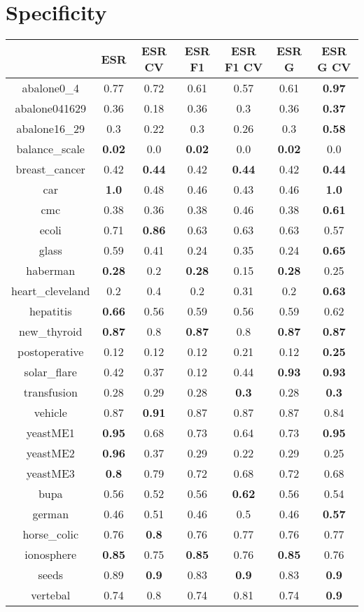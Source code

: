\documentclass{article}%
\begin{document}
%
\section*{Specificity}%
\begin{tabular}{c|cccccc}%
\hline%
&ESR&ESR CV&ESR F1&ESR F1 CV&ESR G&ESR G CV\\%
\hline%
abalone0\_4&0.77&0.72&0.61&0.57&0.61&\textbf{0.97}\\%
\hline%
abalone041629&0.36&0.18&0.36&0.3&0.36&\textbf{0.37}\\%
\hline%
abalone16\_29&0.3&0.22&0.3&0.26&0.3&\textbf{0.58}\\%
\hline%
balance\_scale&\textbf{0.02}&0.0&\textbf{0.02}&0.0&\textbf{0.02}&0.0\\%
\hline%
breast\_cancer&0.42&\textbf{0.44}&0.42&\textbf{0.44}&0.42&\textbf{0.44}\\%
\hline%
car&\textbf{1.0}&0.48&0.46&0.43&0.46&\textbf{1.0}\\%
\hline%
cmc&0.38&0.36&0.38&0.46&0.38&\textbf{0.61}\\%
\hline%
ecoli&0.71&\textbf{0.86}&0.63&0.63&0.63&0.57\\%
\hline%
glass&0.59&0.41&0.24&0.35&0.24&\textbf{0.65}\\%
\hline%
haberman&\textbf{0.28}&0.2&\textbf{0.28}&0.15&\textbf{0.28}&0.25\\%
\hline%
heart\_cleveland&0.2&0.4&0.2&0.31&0.2&\textbf{0.63}\\%
\hline%
hepatitis&\textbf{0.66}&0.56&0.59&0.56&0.59&0.62\\%
\hline%
new\_thyroid&\textbf{0.87}&0.8&\textbf{0.87}&0.8&\textbf{0.87}&\textbf{0.87}\\%
\hline%
postoperative&0.12&0.12&0.12&0.21&0.12&\textbf{0.25}\\%
\hline%
solar\_flare&0.42&0.37&0.12&0.44&\textbf{0.93}&\textbf{0.93}\\%
\hline%
transfusion&0.28&0.29&0.28&\textbf{0.3}&0.28&\textbf{0.3}\\%
\hline%
vehicle&0.87&\textbf{0.91}&0.87&0.87&0.87&0.84\\%
\hline%
yeastME1&\textbf{0.95}&0.68&0.73&0.64&0.73&\textbf{0.95}\\%
\hline%
yeastME2&\textbf{0.96}&0.37&0.29&0.22&0.29&0.25\\%
\hline%
yeastME3&\textbf{0.8}&0.79&0.72&0.68&0.72&0.68\\%
\hline%
bupa&0.56&0.52&0.56&\textbf{0.62}&0.56&0.54\\%
\hline%
german&0.46&0.51&0.46&0.5&0.46&\textbf{0.57}\\%
\hline%
horse\_colic&0.76&\textbf{0.8}&0.76&0.77&0.76&0.77\\%
\hline%
ionosphere&\textbf{0.85}&0.75&\textbf{0.85}&0.76&\textbf{0.85}&0.76\\%
\hline%
seeds&0.89&\textbf{0.9}&0.83&\textbf{0.9}&0.83&\textbf{0.9}\\%
\hline%
vertebal&0.74&0.8&0.74&0.81&0.74&\textbf{0.9}\\%
\hline%
\end{tabular}
\end{document}

